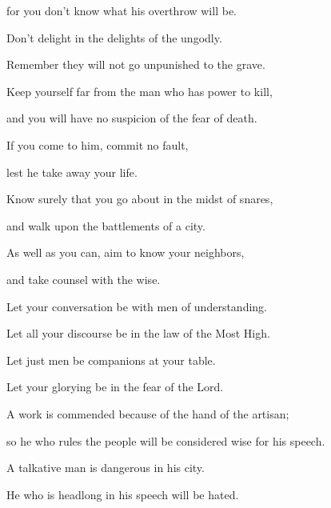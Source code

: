 {\par }{\QB for you don’t know what his overthrow will be.
\par }{\Q {}Don’t delight in the delights of the ungodly.
\par }{\QB Remember they will not go unpunished to
 the grave.
\par }{\BB \par }{\Q {}Keep yourself far from the man who has
 power to kill,
\par }{\QB and you will have no suspicion of the fear of death.
\par }{\Q If you come to him, commit no fault,
\par }{\QB lest he take away your life.
\par }{\Q Know surely that you go about in the midst of snares,
\par }{\QB and walk upon the battlements of a city.
\par }{\BB \par }{\Q {}As well as you can, aim to know your neighbors,
\par }{\QB and take counsel with the wise.
\par }{\Q {}Let your conversation be with men of understanding.
\par }{\QB Let all your discourse be in the law of the Most High.
\par }{\Q {}Let just men be companions at your table.
\par }{\QB Let your glorying be in the fear of the Lord.
\par }{\BB \par }{\Q {}A work is commended because of the hand of the artisan;
\par }{\QB so he who rules the people will be considered wise for his speech.
\par }{\Q {}A talkative man is dangerous in his city.
\par }{\QB He who is headlong in his speech will be hated.
\par }{\BB \par }
